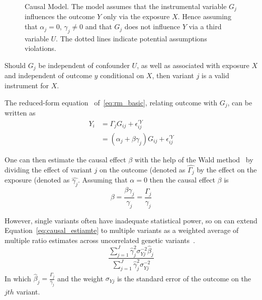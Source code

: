 \begin{figure}[!h]
  \centering
  \resizebox{0.5\textwidth}{!}{}
  \caption[Causal Model]{Causal Model.
    The model assumes that the instrumental variable $G_j$ influences the outcome $Y$ only via the exposure $X$.
    Hence assuming that $\alpha_j=0$, $\gamma_j\neq0$ and that $G_j$ does not influence $Y$ via a third variable $U$. 
    The dotted lines indicate potential assumptions violations.
  }\label{fig:causal}
\end{figure}

Should $G_j$ be independent of confounder $U$,
as well as associated with exposure $X$ and independent of outcome $y$ conditional on $X$, then variant $j$ is a valid instrument for $X$.

The reduced-form equation~\cite{Bowden2015} of~\ref{eq:rm_basic}, relating outcome with $G_j$, can be written as
\begin{equation}
	\begin{split}
		Y_i &= \Gamma_j G_{ij} + \epsilon_{ij}^{'Y} \\
		&= (\alpha_j + \beta\gamma_j)G_{ij} + \epsilon_{ij}^{'Y}
	\end{split}
\end{equation}

One can then estimate the causal effect $\beta$ with the help of the Wald method~\cite{Wald1940}
by dividing the effect of variant $j$ on the outcome (denoted as $\hat{\Gamma_j}$ by the effect on the exposure (denoted as $\hat{\gamma_j}$.
Assuming that $\alpha=0$ then the causal effect $\beta$ is
\begin{equation} \label{eq:causal_estiamte}
	\beta = \frac{\beta\gamma_j}{\gamma_j}= \frac{\Gamma_j}{\gamma_j}
\end{equation}

However, single variants often have inadequate statistical power, so on can extend Equation~\ref{eq:causal_estiamte} to multiple variants as a weighted average of multiple ratio estimates across uncorrelated genetic variants~\cite{Bowden2015}.
\begin{equation} \label{eq:IVW}
  \frac{\sum^J_{j=1} \hat{\gamma}_j^2\sigma_{Yj}^{-2} \hat{\beta}_j}
  {\sum^J_{j=1} \hat{\gamma}_j^2\sigma_{Yj}^{-2}}
\end{equation}
In which $\hat{\beta}_j = \frac{\hat{\Gamma}_j}{\hat{\gamma}_j}$ and the weight $\sigma_{Yj}$ is the standard error of the outcome on the $jth$ variant.

